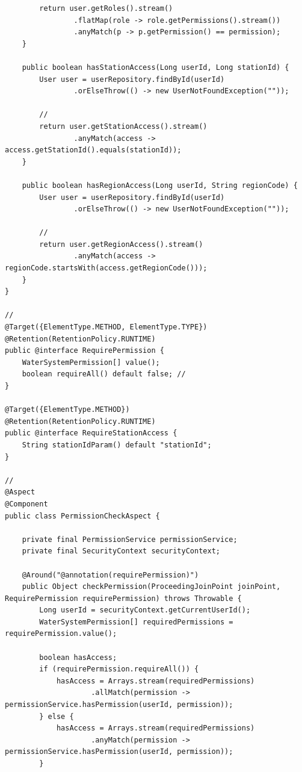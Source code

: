 \begin{verbatim}
        return user.getRoles().stream()
                .flatMap(role -> role.getPermissions().stream())
                .anyMatch(p -> p.getPermission() == permission);
    }
    
    public boolean hasStationAccess(Long userId, Long stationId) {
        User user = userRepository.findById(userId)
                .orElseThrow(() -> new UserNotFoundException(""));
                
        // 
        return user.getStationAccess().stream()
                .anyMatch(access -> access.getStationId().equals(stationId));
    }
    
    public boolean hasRegionAccess(Long userId, String regionCode) {
        User user = userRepository.findById(userId)
                .orElseThrow(() -> new UserNotFoundException(""));
                
        // 
        return user.getRegionAccess().stream()
                .anyMatch(access -> regionCode.startsWith(access.getRegionCode()));
    }
}

// 
@Target({ElementType.METHOD, ElementType.TYPE})
@Retention(RetentionPolicy.RUNTIME)
public @interface RequirePermission {
    WaterSystemPermission[] value();
    boolean requireAll() default false; // 
}

@Target({ElementType.METHOD})
@Retention(RetentionPolicy.RUNTIME)
public @interface RequireStationAccess {
    String stationIdParam() default "stationId";
}

// 
@Aspect
@Component
public class PermissionCheckAspect {
    
    private final PermissionService permissionService;
    private final SecurityContext securityContext;
    
    @Around("@annotation(requirePermission)")
    public Object checkPermission(ProceedingJoinPoint joinPoint, RequirePermission requirePermission) throws Throwable {
        Long userId = securityContext.getCurrentUserId();
        WaterSystemPermission[] requiredPermissions = requirePermission.value();
        
        boolean hasAccess;
        if (requirePermission.requireAll()) {
            hasAccess = Arrays.stream(requiredPermissions)
                    .allMatch(permission -> permissionService.hasPermission(userId, permission));
        } else {
            hasAccess = Arrays.stream(requiredPermissions)
                    .anyMatch(permission -> permissionService.hasPermission(userId, permission));
        }
        

\end{verbatim}
